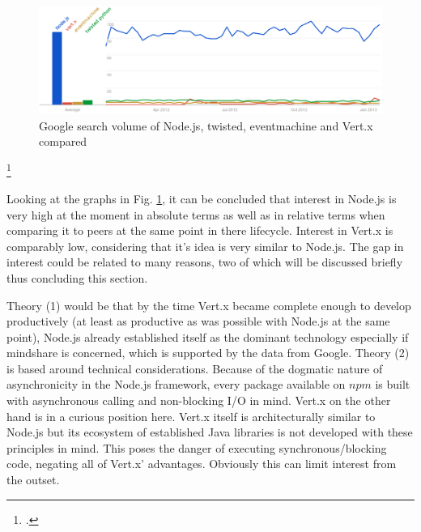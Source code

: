 
\begin{figure}[hbtp]
\centering
\includegraphics[width=\textwidth]{img/googletrend_all.png}
\caption[Google search volume of Node.js, twisted, eventmachine and Vert.x compared]{Google search volume of Node.js, twisted, eventmachine and Vert.x compared}
\label{img_googletrend_all}
\end{figure}
\footcitetext[Cf.][]{g_trends}

Looking at the graphs in Fig. \ref{img_googletrend_all}, it can be
concluded that interest in Node.js is very high at the moment in absolute terms as well
as in relative terms when comparing it to peers at the same point in there lifecycle.
Interest in Vert.x is comparably low, considering that it's idea is very similar to Node.js.
The gap in interest could be related to many reasons, two of which will be discussed 
briefly thus concluding this section.

Theory (1) would be that by the time Vert.x became complete enough to develop
productively (at least as productive as was possible with Node.js at the same
point), Node.js already established itself as the dominant technology especially if
mindshare is concerned, which is supported by the data from Google.
Theory (2) is based around technical considerations. Because of the dogmatic
nature of asynchronicity in the Node.js framework, every package available on
$npm$ is built with asynchronous calling
and non-blocking I/O in mind. Vert.x on the
other hand is in a curious position here. Vert.x itself is architecturally
similar to Node.js but its ecosystem of established Java libraries is not developed
with these principles in mind. This poses the danger of executing
synchronous/blocking code, negating all of Vert.x' advantages. Obviously this
can limit interest from the outset.

